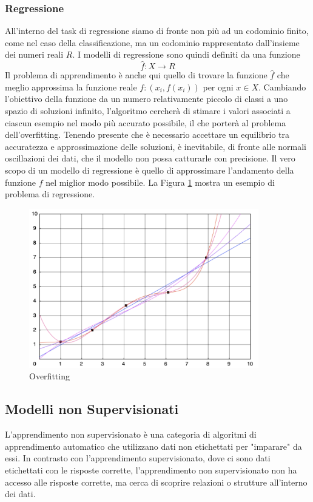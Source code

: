 \subsubsection{Regressione}
All'interno del task di regressione siamo di fronte non più ad un codominio finito, come nel caso della classificazione, ma un codominio rappresentato dall'insieme dei numeri reali \(R\). I modelli di regressione sono quindi definiti da una funzione
\[\hat{f}: X \rightarrow R\]
Il problema di apprendimento è anche qui quello di trovare la funzione \(\hat{f}\) che meglio approssima la funzione reale \(f: (x_i, f(x_i))\) per ogni \(x\in X\).
Cambiando l'obiettivo della funzione da un numero relativamente piccolo di classi a uno spazio di soluzioni infinito, l'algoritmo cercherà di stimare i valori associati a ciascun esempio nel modo più accurato possibile, il che porterà al problema dell'overfitting. Tenendo presente che è necessario accettare un equilibrio tra accuratezza e approssimazione delle soluzioni, è inevitabile, di fronte alle normali oscillazioni dei dati, che il modello non possa catturarle con precisione. Il vero scopo di un modello di regressione è quello di approssimare l'andamento della funzione $f$ nel miglior modo possibile. La Figura \ref{overfitting} mostra un esempio di problema di regressione.

\begin{figure}[t]
	\centering
	\includegraphics[width=10cm, scale=1]{images/overfitting}
	\caption{Overfitting}
	\label{overfitting}
\end{figure}


\subsection{Modelli non Supervisionati}
L'apprendimento non supervisionato è una categoria di algoritmi di apprendimento automatico che utilizzano dati non etichettati per "imparare" da essi. In contrasto con l'apprendimento supervisionato, dove ci sono dati etichettati con le risposte corrette, l'apprendimento non supervisionato non ha accesso alle risposte corrette, ma cerca di scoprire relazioni o strutture all'interno dei dati.

